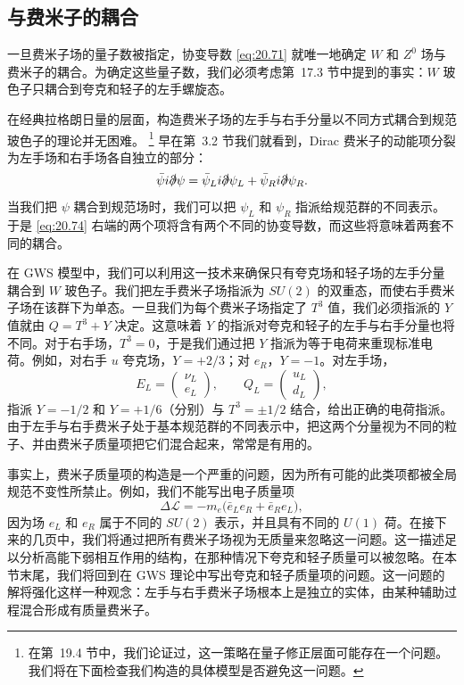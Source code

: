 \subsection{与费米子的耦合}

一旦费米子场的量子数被指定，协变导数 \eqref{eq:20.71} 就唯一地确定 $W$ 和 $Z^0$ 场与费米子的耦合。为确定这些量子数，我们必须考虑第~17.3 节中提到的事实：$W$ 玻色子只耦合到夸克和轻子的左手螺旋态。

在经典拉格朗日量的层面，构造费米子场的左手与右手分量以不同方式耦合到规范玻色子的理论并无困难。%
\footnote{在第~19.4 节中，我们论证过，这一策略在量子修正层面可能存在一个问题。我们将在下面检查我们构造的具体模型是否避免这一问题。} 早在第~3.2 节我们就看到，Dirac 费米子的动能项分裂为左手场和右手场各自独立的部分：
\begin{equation}
  \bar{\psi}i\slashed{\partial}\psi = \bar{\psi}_L i\slashed{\partial}\psi_L
    + \bar{\psi}_R i\slashed{\partial}\psi_R .
  \label{eq:20.74}
\end{equation}
当我们把 $\psi$ 耦合到规范场时，我们可以把 $\psi_L$ 和 $\psi_R$ 指派给规范群的不同表示。于是 \eqref{eq:20.74} 右端的两个项将含有两个不同的协变导数，而这些将意味着两套不同的耦合。

在 GWS 模型中，我们可以利用这一技术来确保只有夸克场和轻子场的左手分量耦合到 $W$ 玻色子。我们把左手费米子场指派为 $SU(2)$ 的双重态，而使右手费米子场在该群下为单态。一旦我们为每个费米子场指定了 $T^3$ 值，我们必须指派的 $Y$ 值就由 $Q = T^3 + Y$ 决定。这意味着 $Y$ 的指派对夸克和轻子的左手与右手分量也将不同。对于右手场，$T^3 = 0$，于是我们通过把 $Y$ 指派为等于电荷来重现标准电荷。例如，对右手 $u$ 夸克场，$Y = +2/3$；对 $e_R$，$Y = -1$。对左手场，
\begin{equation}
  E_L = \begin{pmatrix}\nu_L\\ e_L\end{pmatrix},\qquad
  Q_L = \begin{pmatrix}u_L\\ d_L\end{pmatrix} ,
  \label{eq:20.75}
\end{equation}
指派 $Y = -1/2$ 和 $Y = +1/6$（分别）与 $T^3 = \pm 1/2$ 结合，给出正确的电荷指派。由于左手与右手费米子处于基本规范群的不同表示中，把这两个分量视为不同的粒子、并由费米子质量项把它们混合起来，常常是有用的。

事实上，费米子质量项的构造是一个严重的问题，因为所有可能的此类项都被全局规范不变性所禁止。例如，我们不能写出电子质量项
\begin{equation}
  \Delta\mathcal{L} = -m_e\bigl( \bar{e}_Le_R + \bar{e}_Re_L \bigr) ,
  \label{eq:20.76}
\end{equation}
因为场 $e_L$ 和 $e_R$ 属于不同的 $SU(2)$ 表示，并且具有不同的 $U(1)$ 荷。在接下来的几页中，我们将通过把所有费米子场视为无质量来忽略这一问题。这一描述足以分析高能下弱相互作用的结构，在那种情况下夸克和轻子质量可以被忽略。在本节末尾，我们将回到在 GWS 理论中写出夸克和轻子质量项的问题。这一问题的解将强化这样一种观念：左手与右手费米子场根本上是独立的实体，由某种辅助过程混合形成有质量费米子。

